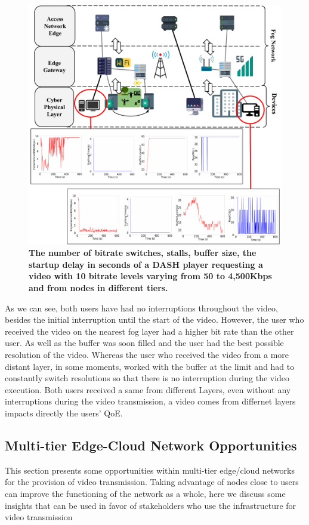 \begin{figure}
    \centering
    \includegraphics[width=0.9\linewidth]{images/qoe-multi-level.pdf}
    \caption{\textbf{The number of bitrate switches, stalls, buffer size, the startup delay in seconds of a DASH player requesting a video with 10 bitrate levels varying from 50 to 4,500Kbps and from nodes in different tiers.}}
    \label{fig:impact-two-layers}
\end{figure}


As we can see, both users have had no interruptions throughout the video, besides the initial interruption until the start of the video. However, the user who received the video on the nearest fog layer had a higher bit rate than the other user. As well as the buffer was soon filled and the user had the best possible resolution of the video. Whereas the user who received the video from a more distant layer, in some moments, worked with the buffer at the limit and had to constantly switch resolutions so that there is no interruption during the video execution. Both users received a same from different Layers, even without any interruptions during the video transmission, a video comes from differnet layers impacts directly the users' QoE.


\subsection{Multi-tier Edge-Cloud Network Opportunities}

This section presents some opportunities within multi-tier edge/cloud networks for the provision of video transmission. Taking advantage of nodes close to users can improve the functioning of the network as a whole, here we discuss some insights that can be used in favor of stakeholders who use the infrastructure for video transmission


